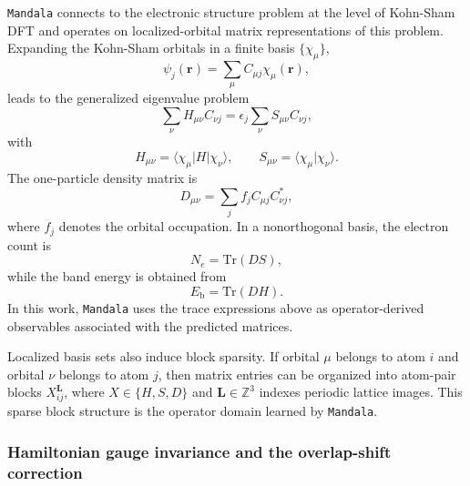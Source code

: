 \documentclass[preprint,12pt,compress,numafflabel]{elsarticle}
\newcommand{\Tr}{\mathrm{Tr}}
\begin{document}
\texttt{Mandala} connects to the electronic structure problem at the level of Kohn-Sham DFT and operates on localized-orbital matrix representations of this problem.
Expanding the Kohn-Sham orbitals in a finite basis $\{\chi_{\mu}\}$,
\begin{equation}
\psi_j(\bm{r}) = \sum_{\mu} C_{\mu j}\chi_{\mu}(\bm{r}),
\end{equation}
leads to the generalized eigenvalue problem
\begin{equation}
\sum_{\nu} H_{\mu \nu} C_{\nu j}
=
\epsilon_j \sum_{\nu} S_{\mu \nu} C_{\nu j},
\end{equation}
with
\begin{equation}
H_{\mu \nu} = \langle \chi_{\mu} | H | \chi_{\nu} \rangle,
\qquad
S_{\mu \nu} = \langle \chi_{\mu} | \chi_{\nu} \rangle.
\end{equation}
The one-particle density matrix is
\begin{equation}
D_{\mu \nu} = \sum_j f_j C_{\mu j} C_{\nu j}^{*},
\end{equation}
where $f_j$ denotes the orbital occupation. In a nonorthogonal basis, the electron count is
\begin{equation}
N_e = \Tr(DS),
\end{equation}
while the band energy is obtained from
\begin{equation}
E_{\mathrm{b}} = \Tr(DH).
\end{equation}
In this work, \texttt{Mandala} uses the trace expressions above as operator-derived observables associated with the predicted matrices.

Localized basis sets also induce block sparsity. If orbital $\mu$ belongs to atom $i$ and orbital $\nu$ belongs to atom $j$, then matrix entries can be organized into atom-pair blocks $X_{ij}^{\bm{L}}$, where $X \in \{H,S,D\}$ and $\bm{L} \in \mathbb{Z}^3$ indexes periodic lattice images. This sparse block structure is the operator domain learned by \texttt{Mandala}.


\subsubsection{Hamiltonian gauge invariance and the overlap-shift correction}
\label{subsubsec:gauge_invariance}
\end{document}
